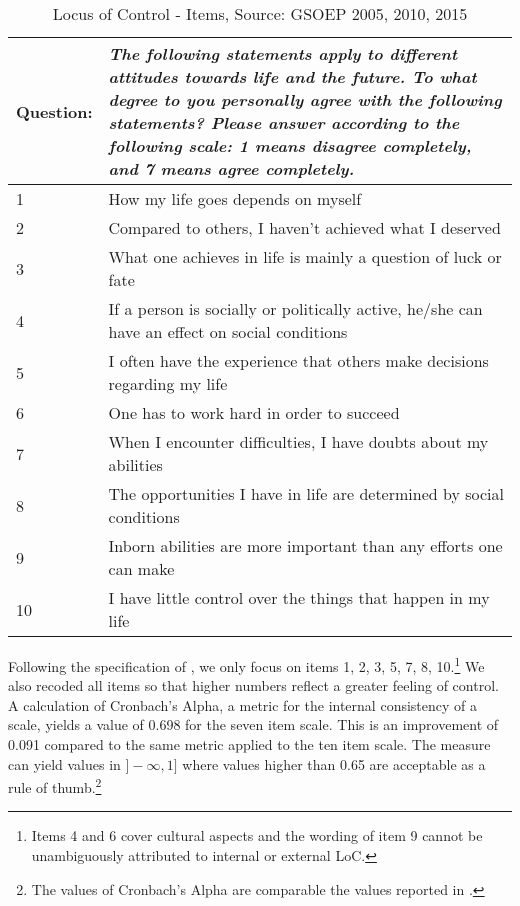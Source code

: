 \documentclass[12pt, a4paper, fleqn, parskip]{scrartcl}
\begin{document}
\begin{table}[H]
    \begin{tabular}{p{1.5cm} p{14cm}}
    \toprule
    Question: & \textit{The following statements apply to different attitudes
    towards life and the future. To what degree to you personally agree with
    the following statements? Please answer according to the following scale: 1
    means disagree completely, and 7 means agree completely.} \\
    \midrule
    1  & How my life goes depends on myself \\
    2  & Compared to others, I haven't achieved what I deserved \\
    3  & What one achieves in life is mainly a question of luck or fate \\
    4  & If a person is socially or politically active, he/she can have an effect on social conditions \\
    5  & I often have the experience that others make decisions regarding my life \\
    6  & One has to work hard in order to succeed \\
    7  & When I encounter difficulties, I have doubts about my abilities \\
    8  & The opportunities I have in life are determined by social conditions \\
    9  & Inborn abilities are more important than any efforts one can make \\
    10 & I have little control over the things that happen in my life \\
    \bottomrule
    \end{tabular}
    \caption{Locus of Control - Items, Source: GSOEP 2005, 2010, 2015}
    \label{tab:loc_items}
\end{table}

Following the specification of \citet{specht2013}, we only focus on items 1, 2,
3, 5, 7, 8, 10.\footnote{Items 4 and 6 cover cultural aspects and the wording
of item 9 cannot be unambiguously attributed to internal or external LoC.} We
also recoded all items so that higher numbers reflect a greater feeling of
control. A calculation of Cronbach's Alpha, a metric for the internal
consistency of a scale, yields a value of 0.698 for the seven item scale. This
is an improvement of 0.091 compared to the same metric applied to the ten item
scale. The measure can yield values in $]-\infty, 1]$ where values higher than
0.65 are acceptable as a rule of thumb.\footnote{The values of Cronbach's Alpha
are comparable the values reported in \citet{richter2017}.}
\end{document}
